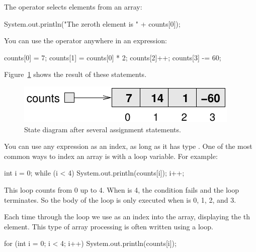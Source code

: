 The \java{[]} operator selects elements from an array:

\begin{code}
System.out.println("The zeroth element is " + counts[0]);
\end{code}

You can use the \java{[]} operator anywhere in an expression:

\begin{code}
counts[0] = 7;
counts[1] = counts[0] * 2;
counts[2]++;
counts[3] -= 60;
\end{code}

Figure~\ref{fig.array2} shows the result of these statements.

\begin{figure}[!ht]
\begin{center}
\includegraphics{figs/array2.pdf}
\caption{State diagram after several assignment statements.}
\label{fig.array2}
\end{center}
\end{figure}

You can use any expression as an index, as long as it has type .
One of the most common ways to index an array is with a loop variable.
For example:

\begin{code}
int i = 0;
while (i < 4) {
    System.out.println(counts[i]);
    i++;
}
\end{code}

This  loop counts from 0 up to 4.
When  is 4, the condition fails and the loop terminates.
So the body of the loop is only executed when  is 0, 1, 2, and 3.


Each time through the loop we use  as an index into the array, displaying the th element.
This type of array processing is often written using a  loop.

\begin{code}
for (int i = 0; i < 4; i++) {
    System.out.println(counts[i]);
}
\end{code}


